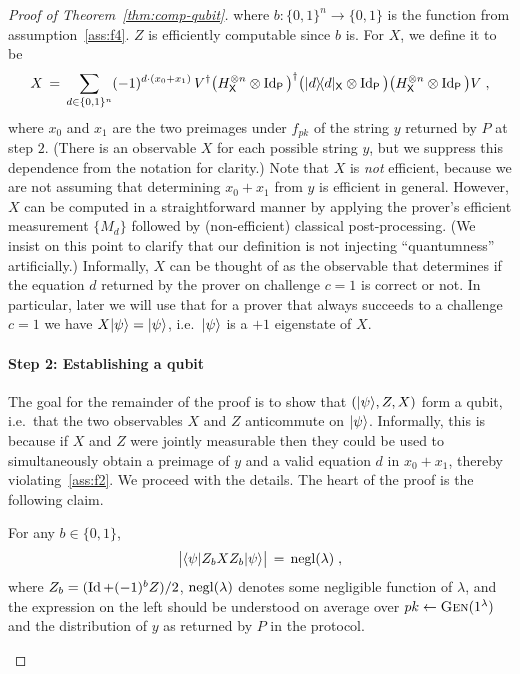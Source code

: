 \begin{proof}[Proof of Theorem~\ref{thm:comp-qubit}]
where $b:\{0,1\}^n\to\{0,1\}$ is the function from assumption~\ref{ass:f4}. 
$Z$ is efficiently computable since $b$ is. For $X$, we define it to be 
\begin{equation}\label{eq:comp-qubit-proof-1b}
 X\,=\, \sum_{d\in\{0,1\}^n} (-1)^{d\cdot(x_0+x_1)}\,  V^\dagger \big(H^{\otimes n}_{\textsf{X}}\otimes \mathop{\rm Id}\nolimits_{\textsf{P}}\big)^\dagger \big(|d\rangle\!\langle d|_{\textsf{X}} \otimes \mathop{\rm Id}\nolimits_{\textsf{P}} \big)\big(H^{\otimes n}_{\textsf{X}}\otimes \mathop{\rm Id}\nolimits_{\textsf{P}}\big) V\;,
\end{equation}
where $x_0$ and $x_1$ are the two preimages under $f_{pk}$ of the string $y$ returned by $P$ at step $2$. (There is an observable $X$ for each possible string $y$, but we suppress this dependence from the notation for clarity.) Note that $X$ is \emph{not} efficient, because we are not assuming that determining $x_0+x_1$ from $y$ is efficient in general. However, $X$ can be computed in a straightforward manner by applying the prover's efficient measurement $\{M_d\}$ followed by (non-efficient) classical post-processing. (We insist on this point to clarify that our definition is not injecting ``quantumness'' artificially.) Informally, $X$ can be thought of as the observable that determines if the equation $d$ returned by the prover on challenge $c=1$ is correct or not. In particular, later we will use that for a prover that always succeeds to a challenge $c=1$ we have $X|\psi\rangle = |\psi\rangle$, i.e.\ $|\psi\rangle$ is a $+1$ eigenstate of $X$. 

\paragraph{Step 2: Establishing a qubit} The goal for the remainder of the proof is to show that $(|\psi\rangle,Z,X)$ form a qubit, i.e.\ that the two observables $X$ and $Z$ anticommute on $|\psi\rangle$. Informally, this is because if $X$ and $Z$ were jointly measurable then they could be used to simultaneously obtain a preimage of $y$ and a valid equation $d$ in $x_0+ x_1$, thereby violating~\ref{ass:f2}. We proceed with the details.  
The heart of the proof is the following claim. 

\begin{claim}\label{claim:comp-qubit-1}
For any $b\in \{0,1\}$, 
\[\big| \langle\psi| Z_b X Z_b |\psi\rangle \big| \,=\, \operatorname{negl}(\lambda) \;,\]
where $Z_b = (\mathop{\rm Id}\nolimits + (-1)^b Z)/2$, $\operatorname{negl}(\lambda)$ denotes some negligible function of $\lambda$, and the expression on the left should be understood on average over $pk\leftarrow \textsc{Gen}(1^\lambda)$ and the distribution of $y$ as returned by $P$ in the protocol. 
\end{claim}


\end{proof}
